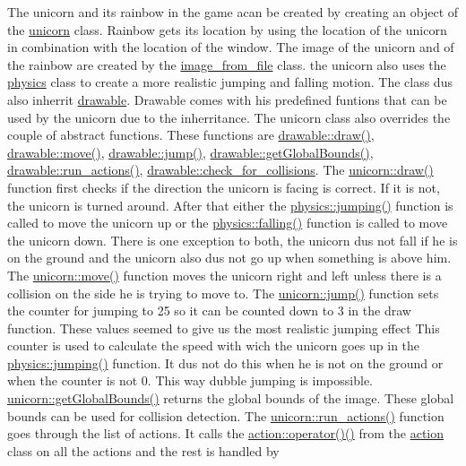 The unicorn and it\textquotesingle{}s rainbow in the game acan be created by creating an object of the \hyperlink{classunicorn}{unicorn} class. Rainbow get\textquotesingle{}s it\textquotesingle{}s location by using the location of the unicorn in combination with the location of the window. The image of the unicorn and of the rainbow are created by the \hyperlink{classimage__from__file}{image\+\_\+from\+\_\+file} class. the unicorn also uses the \hyperlink{classphysics}{physics} class to create a more realistic jumping and falling motion. The class dus also inherrit \hyperlink{classdrawable}{drawable}. Drawable comes with his predefined funtions that can be used by the unicorn due to the inherritance. The unicorn class also overrides the couple of abstract functions. These functions are \hyperlink{classdrawable_a4e49e2c1121704c83ce24c5f48dd910f}{drawable\+::draw()}, \hyperlink{classdrawable_ad0d3930c045cc6776aa2c3965be32491}{drawable\+::move()}, \hyperlink{classdrawable_ac39691470b7874f5dec59efe649d3981}{drawable\+::jump()}, \hyperlink{classdrawable_ae013ac0be47538be9ce885d6642daf73}{drawable\+::get\+Global\+Bounds()}, \hyperlink{classdrawable_a715df01a318331e5611a2b0ad30109ff}{drawable\+::run\+\_\+actions()}, \hyperlink{classdrawable_abbc6e0089d502ba48c3fcb9c96e3966e}{drawable\+::check\+\_\+for\+\_\+collisions}. The \hyperlink{classunicorn_a570c34d5669a8d2a61bdc1481e6f9dee}{unicorn\+::draw()} function first checks if the direction the unicorn is facing is correct. If it is not, the unicorn is turned around. After that either the \hyperlink{classphysics_aaf1c57aa6e35b9c83ccbfdfa8c18468c}{physics\+::jumping()} function is called to move the unicorn up or the \hyperlink{classphysics_acca1ee2fb8b760b6e4ee61ae7c2ee3da}{physics\+::falling()} function is called to move the unicorn down. There is one exception to both, the unicorn dus not fall if he is on the ground and the unicorn also dus not go up when something is above him. The \hyperlink{classunicorn_a162f200a68342f7bc0baaf17c8cf3f9f}{unicorn\+::move()} function moves the unicorn right and left unless there is a collision on the side he is trying to move to. The \hyperlink{classunicorn_a07d5ca4e66632c0e871221a27146805a}{unicorn\+::jump()} function sets the counter for jumping to 25 so it can be counted down to 3 in the draw function. These values seemed to give us the most realistic jumping effect This counter is used to calculate the speed with wich the unicorn goes up in the \hyperlink{classphysics_aaf1c57aa6e35b9c83ccbfdfa8c18468c}{physics\+::jumping()} function. It dus not do this when he is not on the ground or when the counter is not 0. This way dubble jumping is impossible. \hyperlink{classunicorn_a1bac09fc59b04f14f5a093bc4daa04da}{unicorn\+::get\+Global\+Bounds()} returns the global bounds of the image. These global bounds can be used for collision detection. The \hyperlink{classunicorn_aadb47a9981c46d6add8704074df117df}{unicorn\+::run\+\_\+actions()} function goes through the list of actions. It calls the \hyperlink{classaction_a92c003677656b5b3e6e58b19376e6b04}{action\+::operator()()} from the \hyperlink{classaction}{action} class on all the actions and the rest is handled by 